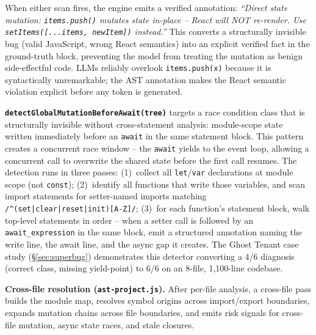 \documentclass[12pt,a4paper]{article}
\newcommand{\code}[1]{\texttt{\small #1}}
\begin{document}
When either scan fires, the engine emits a verified annotation:
\textit{``Direct state mutation: \code{items.push()} mutates state in-place -- React will
NOT re-render. Use \code{setItems([...items, newItem])} instead.''}
This converts a structurally invisible bug (valid JavaScript, wrong React semantics) into
an explicit verified fact in the ground-truth block, preventing the model from treating
the mutation as benign side-effectful code. LLMs reliably overlook \code{items.push(x)}
because it is syntactically unremarkable; the AST annotation makes the React semantic
violation explicit before any token is generated.

\textbf{\code{detectGlobalMutationBeforeAwait(tree)}} targets a race condition class
that is structurally invisible without cross-statement analysis: module-scope state
written immediately before an \code{await} in the same statement block. This pattern
creates a concurrent race window -- the \code{await} yields to the event loop, allowing
a concurrent call to overwrite the shared state before the first call resumes. The
detection runs in three passes: (1)~collect all \code{let}/\code{var} declarations at
module scope (not \code{const}); (2)~identify all functions that write those variables,
and scan import statements for setter-named imports matching
\code{/\^{}(set|clear|reset|init)[A-Z]/}; (3)~for each function's statement block,
walk top-level statements in order -- when a setter call is followed by an
\code{await\_expression} in the same block, emit a structured annotation naming the
write line, the await line, and the async gap it creates. The Ghost Tenant case study
(\S\ref{sec:superbug}) demonstrates this detector converting a 4/6 diagnosis
(correct class, missing yield-point) to 6/6 on an 8-file, 1,100-line codebase.

\textbf{Cross-file resolution (\code{ast-project.js}).} After per-file analysis, a
cross-file pass builds the module map, resolves symbol origins across import/export
boundaries, expands mutation chains across file boundaries, and emits risk signals for
cross-file mutation, async state races, and stale closures.
\end{document}
